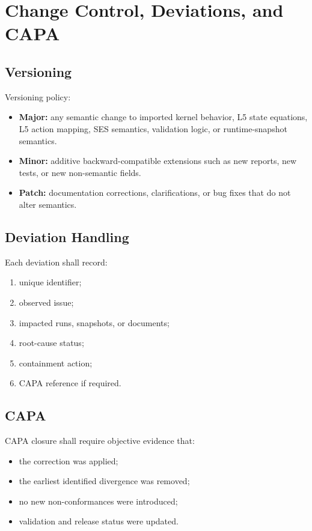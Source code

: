 \chapter{Change Control, Deviations, and CAPA}
\section{Versioning}

Versioning policy:
\begin{itemize}
    \item \textbf{Major:} any semantic change to imported kernel behavior, L5 state equations, L5 action mapping, SES semantics, validation logic, or runtime-snapshot semantics.
    \item \textbf{Minor:} additive backward-compatible extensions such as new reports, new tests, or new non-semantic fields.
    \item \textbf{Patch:} documentation corrections, clarifications, or bug fixes that do not alter semantics.
\end{itemize}

\section{Deviation Handling}

Each deviation shall record:
\begin{enumerate}[leftmargin=1.2cm]
    \item unique identifier;
    \item observed issue;
    \item impacted runs, snapshots, or documents;
    \item root-cause status;
    \item containment action;
    \item CAPA reference if required.
\end{enumerate}

\section{CAPA}

CAPA closure shall require objective evidence that:
\begin{itemize}
    \item the correction was applied;
    \item the earliest identified divergence was removed;
    \item no new non-conformances were introduced;
    \item validation and release status were updated.
\end{itemize}
